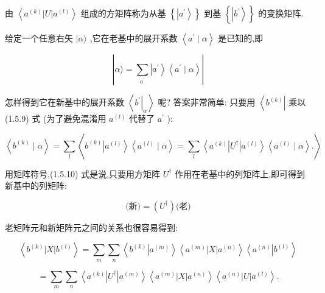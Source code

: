 \documentclass[lang=cn,newtx,10pt,scheme=chinese,thmcnt=section]{elegantbook}
\begin{document}
由 $\left\langle {{a}^{\left( k\right) }\left| U\right| {a}^{\left( l\right) }}\right\rangle$ 组成的方矩阵称为从基 $\left\{ \left| {a}^{\prime }\right\rangle \right\}$ 到基 $\left\{ \left| {b}^{\prime }\right\rangle \right\}$ 的变换矩阵.

给定一个任意右矢 $|\alpha \rangle$ ,它在老基中的展开系数 $\left\langle {{a}^{\prime } \mid \alpha }\right\rangle$ 是已知的,即

$$
\left| {\alpha \rangle = \mathop{\sum }\limits_{{a}^{\prime }}\left| {a}^{\prime }\right\rangle \left\langle {{a}^{\prime } \mid \alpha }\right\rangle }\right| \tag{1.5.9}
$$

怎样得到它在新基中的展开系数 $\left\langle {\left. {b}^{\prime }\right| }_{\alpha }\right\rangle$ 呢? 答案非常简单: 只要用 $\left\langle {b}^{\left( k\right) }\right|$ 乘以 (1.5.9) 式 (为了避免混淆用 ${a}^{\left( l\right) }$ 代替了 ${a}^{\prime }$ ):

$$
\left\langle {{b}^{\left( k\right) } \mid \alpha }\right\rangle = \mathop{\sum }\limits_{l}\left\langle {{b}^{\left( k\right) }\left| {a}^{\left( l\right) }\right\rangle \left\langle {{a}^{\left( l\right) } \mid \alpha }\right\rangle = \mathop{\sum }\limits_{l}\left\langle {{a}^{\left( k\right) }\left| {U}^{ \dagger }\right| {a}^{\left( l\right) }}\right\rangle \left\langle {{a}^{\left( l\right) } \mid \alpha }\right\rangle .}\right\rangle \tag{1.5.10}
$$

用矩阵符号,(1.5.10) 式是说,只要用方矩阵 ${U}^{ \dagger }$ 作用在老基中的列矩阵上,即可得到新基中的列矩阵:

$$
\text{(新)} = \left( {U}^{ \dagger }\right) \text{(老)} \tag{1.5.11}
$$

老矩阵元和新矩阵元之间的关系也很容易得到:

$$
\left\langle {{b}^{\left( k\right) }\left| X\right| {b}^{\left( l\right) }}\right\rangle = \mathop{\sum }\limits_{m}\mathop{\sum }\limits_{n}\left\langle {{b}^{\left( k\right) }\left| {a}^{\left( m\right) }\right\rangle \left\langle {{a}^{\left( m\right) }\left| X\right| {a}^{\left( n\right) }}\right\rangle \left\langle {a}^{\left( n\right) }\right| {b}^{\left( l\right) }}\right\rangle \tag{1.5.12}
$$

$$
= \mathop{\sum }\limits_{m}\mathop{\sum }\limits_{n}\left\langle {{a}^{\left( k\right) }\left| {U}^{ \dagger }\right| {a}^{\left( m\right) }}\right\rangle \left\langle {{a}^{\left( m\right) }\left| X\right| {a}^{\left( n\right) }}\right\rangle \left\langle {{a}^{\left( n\right) }\left| U\right| {a}^{\left( l\right) }}\right\rangle .
$$
\end{document}
